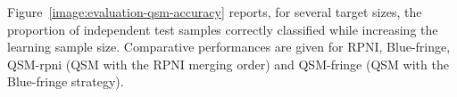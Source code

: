 Figure~\ref{image:evaluation-qsm-accuracy} reports, for several target sizes, the proportion of independent test samples correctly classified while increasing the learning sample size. Comparative performances are given for RPNI, Blue-fringe, QSM-rpni (QSM with the RPNI merging order) and QSM-fringe (QSM with the Blue-fringe strategy).

\begin{figure}[t]
\centering
{}\vspace{0.35cm}
\scalebox{.25}{
}
\end{figure}
